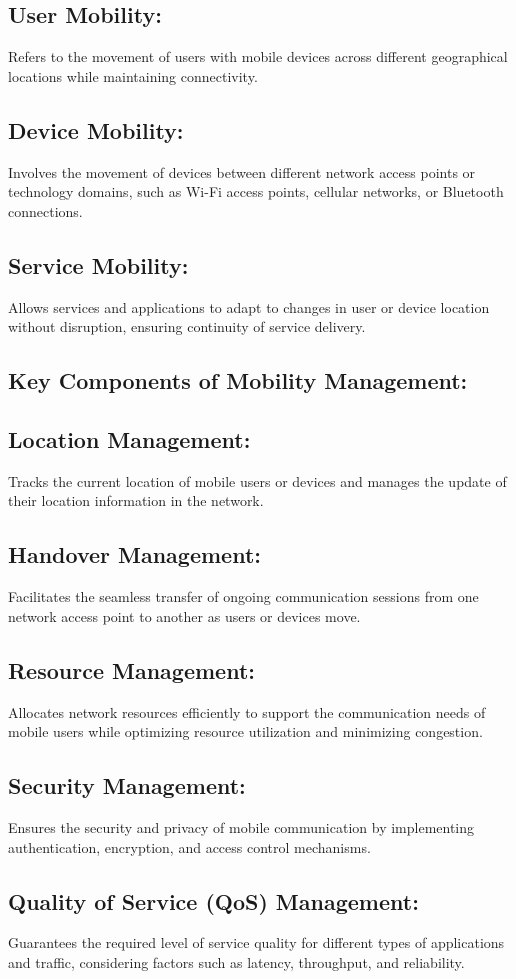 \documentclass[12pt]{report}
\begin{document}
\subsection*{User Mobility:}  Refers to the movement of users with mobile devices across different geographical locations while maintaining connectivity.
\subsection*{Device Mobility:} Involves the movement of devices between different network access points or technology domains, such as Wi-Fi access points, cellular networks, or Bluetooth connections.
\subsection*{Service Mobility:}  Allows services and applications to adapt to changes in user or device location without disruption, ensuring continuity of service delivery.
\subsection*{Key Components of Mobility Management:}
\subsection*{Location Management:} Tracks the current location\cite{location} of mobile users or devices and manages the update of their location information in the network.
\subsection*{Handover Management:}  Facilitates the seamless transfer of ongoing communication sessions from one network access point to another as users or devices move.\cite{handover}
\subsection*{Resource Management:} Allocates network resources efficiently to support the communication needs of mobile users while optimizing resource utilization and minimizing congestion.
\subsection*{Security Management:}
Ensures the security and privacy of mobile communication by implementing authentication, encryption, and access control mechanisms.
\subsection*{Quality of Service (QoS) Management:}  Guarantees the required level of service quality for different types of applications and traffic, considering factors such as latency, throughput, and reliability.
\end{document}
